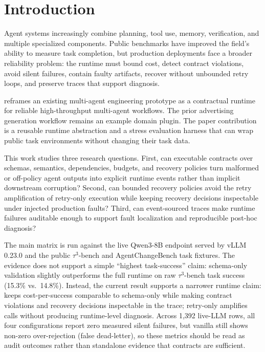 \section{Introduction}

Agent systems increasingly combine planning, tool use, memory, verification, and multiple specialized components. Public benchmarks have improved the field's ability to measure task completion, but production deployments face a broader reliability problem: the runtime must bound cost, detect contract violations, avoid silent failures, contain faulty artifacts, recover without unbounded retry loops, and preserve traces that support diagnosis.

\system reframes an existing multi-agent engineering prototype as a contractual runtime for reliable high-throughput multi-agent workflows. The prior advertising generation workflow remains an example domain plugin. The paper contribution is a reusable runtime abstraction and a stress evaluation harness that can wrap public task environments without changing their task data.

This work studies three research questions. First, can executable contracts over schemas, semantics, dependencies, budgets, and recovery policies turn malformed or off-policy agent outputs into explicit runtime events rather than implicit downstream corruption? Second, can bounded recovery policies avoid the retry amplification of retry-only execution while keeping recovery decisions inspectable under injected production faults? Third, can event-sourced traces make runtime failures auditable enough to support fault localization and reproducible post-hoc diagnosis?

The main matrix is run against the live Qwen3-8B endpoint served by vLLM 0.23.0 and the public \mbox{$\tau^3$}-bench and AgentChangeBench task fixtures. The evidence does not support a simple ``highest task-success'' claim: schema-only validation slightly outperforms the full runtime on raw \mbox{$\tau^3$}-bench task success (15.3\% vs.\ 14.8\%). Instead, the current result supports a narrower runtime claim: \system{} keeps cost-per-success comparable to schema-only while making contract violations and recovery decisions inspectable in the trace; retry-only amplifies calls without producing runtime-level diagnosis. Across 1{,}392 live-LLM rows, all four configurations report zero measured silent failures, but vanilla still shows non-zero over-rejection (false dead-letter), so these metrics should be read as audit outcomes rather than standalone evidence that contracts are sufficient.

